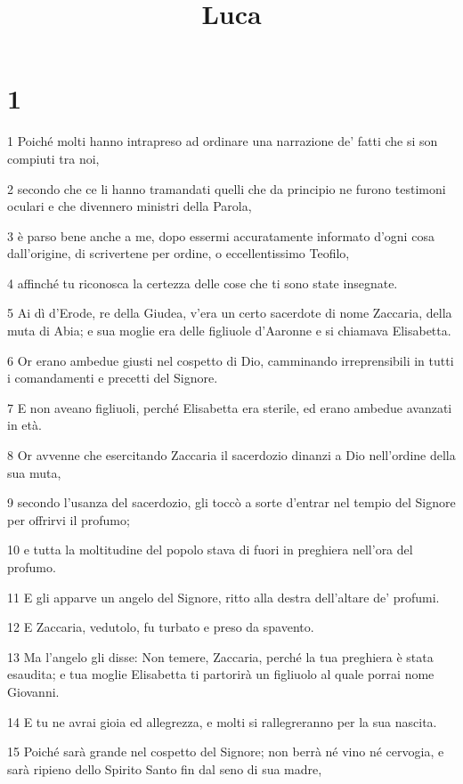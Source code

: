 

\title{Luca}


\chapter{1}

\par 1 Poiché molti hanno intrapreso ad ordinare una narrazione de' fatti che si son compiuti tra noi,
\par 2 secondo che ce li hanno tramandati quelli che da principio ne furono testimoni oculari e che divennero ministri della Parola,
\par 3 è parso bene anche a me, dopo essermi accuratamente informato d'ogni cosa dall'origine, di scrivertene per ordine, o eccellentissimo Teofilo,
\par 4 affinché tu riconosca la certezza delle cose che ti sono state insegnate.
\par 5 Ai dì d'Erode, re della Giudea, v'era un certo sacerdote di nome Zaccaria, della muta di Abia; e sua moglie era delle figliuole d'Aaronne e si chiamava Elisabetta.
\par 6 Or erano ambedue giusti nel cospetto di Dio, camminando irreprensibili in tutti i comandamenti e precetti del Signore.
\par 7 E non aveano figliuoli, perché Elisabetta era sterile, ed erano ambedue avanzati in età.
\par 8 Or avvenne che esercitando Zaccaria il sacerdozio dinanzi a Dio nell'ordine della sua muta,
\par 9 secondo l'usanza del sacerdozio, gli toccò a sorte d'entrar nel tempio del Signore per offrirvi il profumo;
\par 10 e tutta la moltitudine del popolo stava di fuori in preghiera nell'ora del profumo.
\par 11 E gli apparve un angelo del Signore, ritto alla destra dell'altare de' profumi.
\par 12 E Zaccaria, vedutolo, fu turbato e preso da spavento.
\par 13 Ma l'angelo gli disse: Non temere, Zaccaria, perché la tua preghiera è stata esaudita; e tua moglie Elisabetta ti partorirà un figliuolo al quale porrai nome Giovanni.
\par 14 E tu ne avrai gioia ed allegrezza, e molti si rallegreranno per la sua nascita.
\par 15 Poiché sarà grande nel cospetto del Signore; non berrà né vino né cervogia, e sarà ripieno dello Spirito Santo fin dal seno di sua madre,
